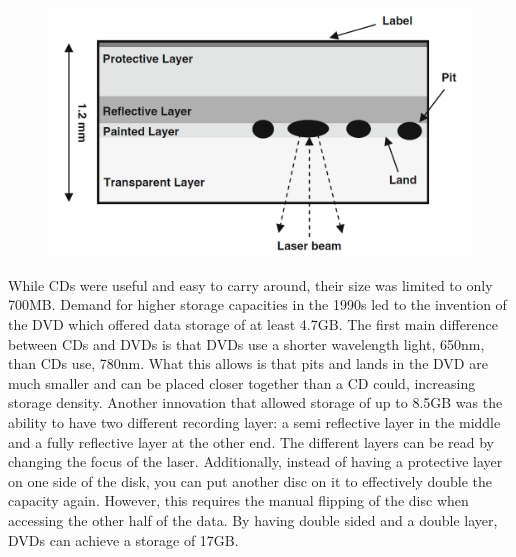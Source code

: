 \documentclass[ aip, 12pt]{revtex4-1} %
\begin{document}
\begin{figure}[H]
\centerline{\includegraphics[scale=.45]{cdR.png}}
\caption{ }
\label{cdR}
\end{figure} 

While CDs were useful and easy to carry around, their size was limited to only 700MB. Demand for higher storage capacities in the 1990s led to the invention of the DVD which offered data storage of at least 4.7GB. The first main difference between CDs and DVDs is that DVDs use a shorter wavelength light, 650nm, than CDs use, 780nm. What this allows is that pits and lands in the DVD are much smaller and can be placed closer together than a CD could, increasing storage density. Another innovation that allowed storage of up to 8.5GB was the ability to have two different recording layer: a semi reflective layer in the middle and a fully reflective layer at the other end. The different layers can be read by changing the focus of the laser. Additionally, instead of having a protective layer on one side of the disk, you can put another disc on it to effectively double the capacity again. However, this requires the manual flipping of the disc when accessing the other half of the data. By having double sided and a double layer, DVDs can achieve a storage of 17GB.
\end{document}
